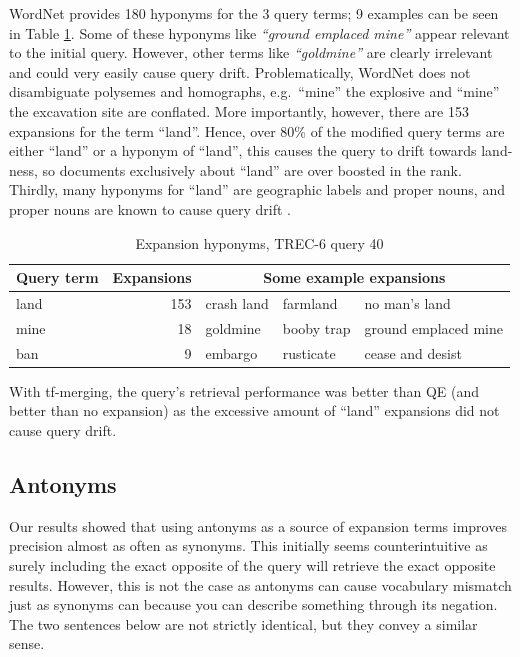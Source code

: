 WordNet provides 180 hyponyms for the 3 query terms; 9 examples can be seen in Table \ref{example-query}. Some of these hyponyms like \textit{``ground emplaced mine''} appear relevant to the initial query. However, other terms like \textit{``goldmine''} are clearly irrelevant and could very easily cause query drift. Problematically, WordNet does not disambiguate polysemes and homographs, e.g.\ ``mine'' the explosive and ``mine'' the excavation site are conflated. More importantly, however, there are 153 expansions for the term ``land''. Hence, over 80\% of the modified query terms are either ``land'' or a hyponym of ``land'', this causes the query to drift towards land-ness, so documents exclusively about ``land'' are over boosted in the rank. Thirdly, many hyponyms for ``land'' are geographic labels and proper nouns, and proper nouns are known to cause query drift \cite{vechtomova2004use}.

\begin{table}[h]
    \centering
    \small
    \begin{tabular}{|l|r|l l l|}
        \hline
        Query term & Expansions & \multicolumn{3}{c|}{Some example expansions} \\
        \hline
        \small
        land & 153 & crash land	& farmland 	& no man's land \\
        mine & 18  & goldmine		& booby trap 	& ground emplaced mine \\
        ban  & 9   & embargo		& rusticate 	& cease and desist \\
        \hline
    \end{tabular}
        \caption{Expansion hyponyms, TREC-6 query 40}
    \label{example-query}
\end{table}

With tf-merging, the query's retrieval performance was better than QE (and better than no expansion) as the excessive amount of ``land'' expansions did not cause query drift.

\subsection{Antonyms}
Our results showed that using antonyms as a source of expansion terms improves precision almost as often as synonyms. This initially seems counterintuitive as surely including the exact opposite of the query will retrieve the exact opposite results. However, this is not the case as antonyms can cause vocabulary mismatch just as synonyms can because you can describe something through its negation. The two sentences below are not strictly identical, but they convey a similar sense.


